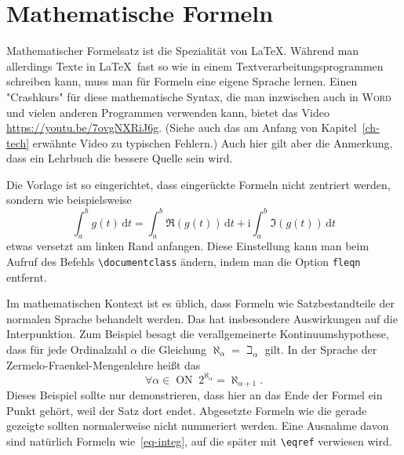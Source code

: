 \section{Mathematische Formeln}

Mathematischer Formelsatz ist die Spezialität von \LaTeX.  Während man
allerdings Texte in \LaTeX\ fast so wie in einem Textverarbeitungsprogrammen
schreiben kann, muss man für Formeln eine eigene Sprache lernen.  Einen
"Crashkurs" für diese mathematische Syntax, die man inzwischen auch in
\textsc{Word} und vielen anderen Programmen verwenden kann, bietet das Video
\url{https://youtu.be/7ovgNXRiJ6g}.  (Siehe auch das am Anfang von
Kapitel~\ref{ch-tech} erwähnte Video zu typischen Fehlern.)  Auch hier gilt
aber die Anmerkung, dass ein Lehrbuch die bessere Quelle sein wird.

Die Vorlage ist so eingerichtet, dass eingerückte Formeln nicht zentriert
werden, sondern wie beispielsweise
\begin{equation}
  \int_a^b g(t)\,\mathrm{d}t = \int_a^b \Re(g(t))\,\mathrm{d}t + \mathrm{i}\int_a^b \Im(g(t))\,\mathrm{d}t\label{eq-integ}
\end{equation}
etwas versetzt am linken Rand anfangen.  Diese Einstellung kann man beim
Aufruf des Befehls \verb|\documentclass| ändern, indem man die Option
\verb|fleqn| entfernt.

Im mathematischen Kontext ist es üblich, dass Formeln wie Satzbestandteile der
normalen Sprache behandelt werden.  Das hat insbesondere Auswirkungen auf die
Interpunktion.  Zum Beispiel besagt die verallgemeinerte Kontinuumshypothese,
dass für jede Ordinalzahl $\alpha$ die Gleichung
$\aleph_\alpha = \beth_\alpha$ gilt.  In der Sprache der
Zermelo-Fraenkel-Mengenlehre heißt das
\[ \forall \alpha \in \operatorname{ON} \; 2^{\aleph_\alpha} =
  \aleph_{\alpha+1}. \] Dieses Beispiel sollte nur demonstrieren, dass hier an
das Ende der Formel ein Punkt gehört, weil der Satz dort endet.
Abgesetzte Formeln wie die gerade gezeigte sollten normalerweise nicht
nummeriert werden.  Eine Ausnahme davon sind natürlich Formeln
wie~\eqref{eq-integ}, auf die später mit \verb|\eqref| verwiesen wird.

